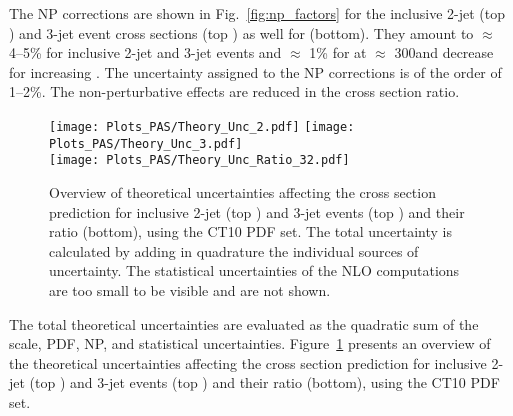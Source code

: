 The NP corrections are shown in Fig.~\ref{fig:np_factors} for the
inclusive 2-jet (top \cmsLeft) and 3-jet event cross sections (top
\cmsRight) as well for \ratio (bottom). They amount to $\approx$
4--5\% for inclusive 2-jet and 3-jet events and $\approx$ 1\% for
\ratio at \httwo $\approx$ 300\GeV and decrease for increasing
\httwo. The uncertainty assigned to the NP corrections is of the order
of 1--2\%. The non-perturbative effects are reduced in the cross
section ratio.

\begin{figure}[h]
  \hftwo\texttt{[image: Plots\_PAS/Theory\_Unc\_2.pdf]}\hftwo%
  \texttt{[image: Plots\_PAS/Theory\_Unc\_3.pdf]}\hftwo\\
  \hftwo\texttt{[image: Plots\_PAS/Theory\_Unc\_Ratio\_32.pdf]}\hftwo
  \caption{Overview of theoretical uncertainties affecting the cross
    section prediction for inclusive 2-jet (top \cmsLeft) and 3-jet
    events (top \cmsRight) and their ratio \ratio (bottom), using the CT10 PDF set. The total uncertainty
    is calculated by adding in quadrature the individual sources of
    uncertainty. The statistical uncertainties of the NLO computations
    are too small to be visible and are not shown.}
  \label{fig:theory_unc}
\end{figure}

The total theoretical uncertainties are evaluated as the quadratic sum
of the scale, PDF, NP, and statistical
uncertainties. Figure~\ref{fig:theory_unc} presents an overview of the
theoretical uncertainties affecting the cross section prediction for
inclusive 2-jet (top \cmsLeft) and 3-jet events (top \cmsRight) and their ratio \ratio (bottom),
using the CT10 PDF set.
